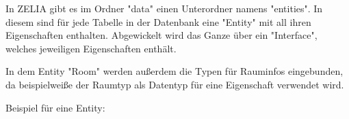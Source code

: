 
In ZELIA gibt es im Ordner "data" einen Unterordner namens "entities". In diesem sind für jede Tabelle in der Datenbank eine "Entity" mit all ihren Eigenschaften enthalten. Abgewickelt wird das Ganze über ein "Interface", welches jeweiligen Eigenschaften enthält.

In dem Entity "Room" werden außerdem die Typen für Rauminfos eingebunden, da beispielweiße der Raumtyp als Datentyp für eine Eigenschaft verwendet wird.

Beispiel für eine Entity:

